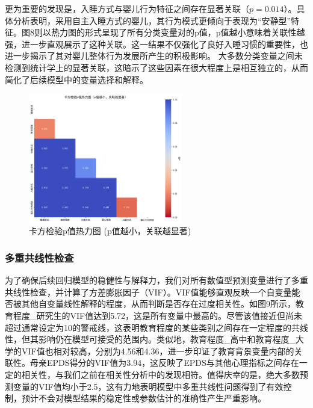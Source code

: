 \documentclass[withoutpreface,bwprint]{cumcmthesis}
\begin{document}
更为重要的发现是，入睡方式与婴儿行为特征之间存在显著关联（$p=0.014$）。具体分析表明，采用自主入睡方式的婴儿，其行为模式更倾向于表现为“安静型”特征。图8则以热力图的形式呈现了所有分类变量对的p值，p值越小意味着关联性越强，进一步直观展示了这种关联。这一结果不仅强化了良好入睡习惯的重要性，也进一步揭示了其对婴儿整体行为发展所产生的积极影响。
大多数分类变量之间未检测到统计学上的显著关联，这暗示了这些因素在很大程度上是相互独立的，从而简化了后续模型中的变量选择和解释。

\begin{figure}[htbp]
    \centering
    \includegraphics[width=0.6\textwidth]{figures/chi_square_p_values_heatmap.png}
    \caption{卡方检验p值热力图 (p值越小，关联越显著)}
    \label{fig:chi_square_p_values_heatmap}
\end{figure}

\subsubsection{多重共线性检查}
为了确保后续回归模型的稳健性与解释力，我们对所有数值型预测变量进行了多重共线性检查，并计算了方差膨胀因子（VIF）。VIF值能够直观反映一个自变量能否被其他自变量线性解释的程度，从而判断是否存在过度相关性。如图9所示，教育程度\_研究生的VIF值达到5.72，这是所有变量中最高的。尽管该值接近但尚未超过通常设定为10的警戒线，这表明教育程度的某些类别之间存在一定程度的共线性，但其影响仍在模型可接受的范围内。类似地，教育程度\_高中和教育程度\_大学的VIF值也相对较高，分别为4.56和4.36，进一步印证了教育背景变量内部的关联性。母亲EPDS得分的VIF值为3.94，这反映了EPDS与其他心理指标之间存在一定的相关性，与我们之前在相关性分析中的发现相符。值得庆幸的是，绝大多数预测变量的VIF值均小于2.5，这有力地表明模型中多重共线性问题得到了有效控制，预计不会对模型结果的稳定性或参数估计的准确性产生严重影响。
\end{document}
